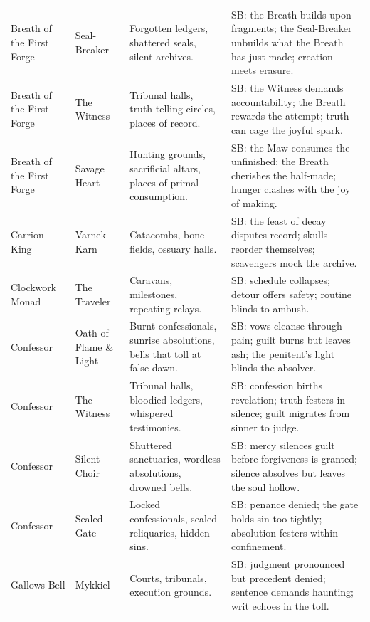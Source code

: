 \begin{longtable}{@{}p{3.3cm}p{3.3cm}p{4.6cm}p{7.2cm}@{}}
  Breath of the First Forge & Seal-Breaker &
  Forgotten ledgers, shattered seals, silent archives. &
  SB: the Breath builds upon fragments; the Seal-Breaker unbuilds what the Breath has just made; creation meets erasure. \\

  Breath of the First Forge & The Witness &
  Tribunal halls, truth-telling circles, places of record. &
  SB: the Witness demands accountability; the Breath rewards the attempt; truth can cage the joyful spark. \\

  Breath of the First Forge & Savage Heart &
  Hunting grounds, sacrificial altars, places of primal consumption. &
  SB: the Maw consumes the unfinished; the Breath cherishes the half-made; hunger clashes with the joy of making. \\

  Carrion King & Varnek Karn &
  Catacombs, bone-fields, ossuary halls. &
  SB: the feast of decay disputes record; skulls reorder themselves; scavengers mock the archive. \\

  Clockwork Monad & The Traveler &
  Caravans, milestones, repeating relays. &
  SB: schedule collapses; detour offers safety; routine blinds to ambush. \\

  Confessor & Oath of Flame \& Light &
  Burnt confessionals, sunrise absolutions, bells that toll at false dawn. &
  SB: vows cleanse through pain; guilt burns but leaves ash; the penitent's light blinds the absolver. \\

  Confessor & The Witness &
  Tribunal halls, bloodied ledgers, whispered testimonies. &
  SB: confession births revelation; truth festers in silence; guilt migrates from sinner to judge. \\

  Confessor & Silent Choir &
  Shuttered sanctuaries, wordless absolutions, drowned bells. &
  SB: mercy silences guilt before forgiveness is granted; silence absolves but leaves the soul hollow. \\

  Confessor & Sealed Gate &
  Locked confessionals, sealed reliquaries, hidden sins. &
  SB: penance denied; the gate holds sin too tightly; absolution festers within confinement. \\

  Gallows Bell & Mykkiel &
  Courts, tribunals, execution grounds. &
  SB: judgment pronounced but precedent denied; sentence demands haunting; writ echoes in the toll. \\


\end{longtable}
